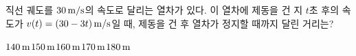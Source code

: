 직선 궤도를 $30\mkern3mu \mathrm{m/s}$의 속도로 달리는 열차가 있다. 이 열차에 제동을 건 지 $t$초 후의 속도가 $v(t)=(30-3t)\mkern3mu \mathrm{m/s}$일 때, 제동을 건 후 열차가 정지할 때까지 달린 거리는?
\begin{choices32}{$140\mkern3mu \mathrm{m}$}{$150\mkern3mu \mathrm{m}$}{$160\mkern3mu \mathrm{m}$}{$170\mkern3mu \mathrm{m}$}{$180\mkern3mu \mathrm{m}$}\end{choices32}
